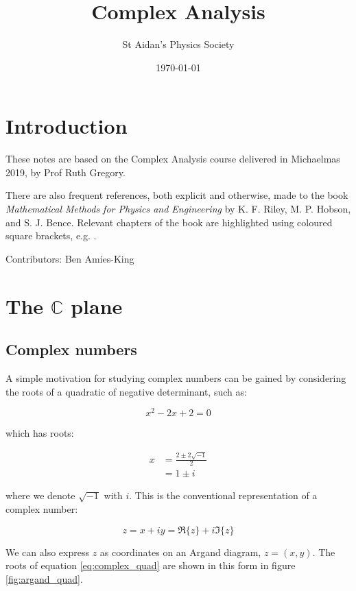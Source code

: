 \documentclass{../../physics_notes}
\title{Complex Analysis}
\author{St Aidan's Physics Society}
\date{\today}
\begin{document}
\maketitle

\section*{Introduction}

These notes are based on the Complex Analysis course delivered in Michaelmas 2019, by Prof Ruth Gregory. 

There are also frequent references, both explicit and otherwise, made to the book \emph{Mathematical Methods for Physics and Engineering} by K. F. Riley, M. P. Hobson, and S. J. Bence. Relevant chapters of the book are highlighted using coloured square brackets, e.g. .

Contributors: Ben Amies-King

\section{The $\mathbb{C}$ plane}
\subsection{Complex numbers}

A simple motivation for studying complex numbers can be gained by considering the roots of a quadratic of negative determinant, such as:

\begin{equation}\label{eq:complex_quad}
x^2 -2x + 2 = 0
\end{equation}

which has roots:

\begin{align}
x &= \frac{2 \pm 2\sqrt{-1}}{2} \nonumber \\
&= 1 \pm i \nonumber
\end{align}

where we denote $\sqrt{-1}$ with $i$. This is the conventional representation of a complex number:

\begin{equation}
z = x + iy = \Re\{z\} + i\Im\{z\}
\end{equation}

We can also express $z$ as coordinates on an Argand diagram, $z = (x,y)$. The roots of equation \ref{eq:complex_quad} are shown in this form in figure \ref{fig:argand_quad}.
\end{document}
